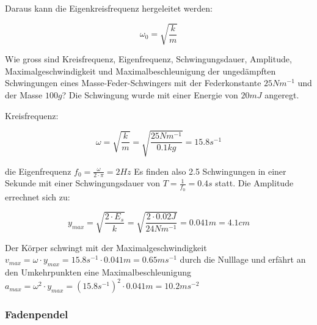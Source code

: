 Daraus kann die Eigenkreisfrequenz hergeleitet werden:

\begin{equbox}
    \begin{equation}
        \omega_0 = \sqrt{\frac{k}{m}}
    \end{equation}
\end{equbox}

\begin{bspbox}
    Wie gross sind Kreisfrequenz, Eigenfrequenz, Schwingungsdauer, 
    Amplitude, Maximalgeschwindigkeit und
    Maximalbeschleunigung der ungedämpften Schwingungen 
    eines Masse-Feder-Schwingers mit der Federkonstante 
    $25 Nm^{-1}$ und der Masse $100 g$? Die Schwingung
    wurde mit einer Energie von $20 mJ$ angeregt.

    Kreisfrequenz:

    \begin{equation*}
        \omega = \sqrt{\frac{k}{m}} = \sqrt{\frac{25Nm^{-1}}{0.1kg}} = 15.8s^{-1}
    \end{equation*}

    die Eigenfrequenz $f_0 = \frac{\omega}{2 \cdot \pi} = 2Hz$
    Es finden also 2.5 Schwingungen in einer Sekunde mit einer 
    Schwingungsdauer von $T = \frac{1}{f_0} = 0.4s$ statt. 
    Die Amplitude errechnet sich zu:

    \begin{equation*}
        y_{max} = \sqrt{\frac{2 \cdot E_s}{k}} = \sqrt{\frac{2 \cdot 0.02J}{24Nm^{-1}}} = 0.041m = 4.1cm
    \end{equation*}

    Der Körper schwingt mit der
    Maximalgeschwindigkeit 
    $v_{max} = \omega \cdot y_{max} = 15.8 s^{-1} \cdot 0.041 m
    = 0.65ms^{-1}$ durch die Nulllage und erfährt an den Umkehrpunkten 
    eine Maximalbeschleunigung $a_{max} = \omega^2 \cdot y_{max} 
    = (15.8s^{-1})^2 \cdot 0.041m = 10.2ms^{-2}$
\end{bspbox}

\subsubsection{Fadenpendel}

